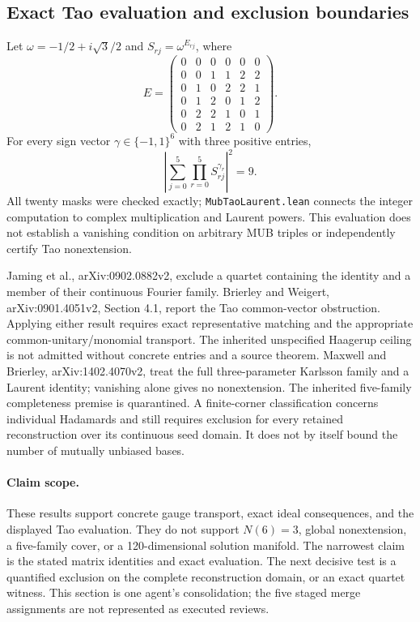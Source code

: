 \subsection{Exact Tao evaluation and exclusion boundaries}
Let $\omega=-1/2+i\sqrt3/2$ and $S_{rj}=\omega^{E_{rj}}$, where
\[
 E=\begin{pmatrix}
 0&0&0&0&0&0\\0&0&1&1&2&2\\0&1&0&2&2&1\\
 0&1&2&0&1&2\\0&2&2&1&0&1\\0&2&1&2&1&0
 \end{pmatrix}.
\]
For every sign vector $\gamma\in\{-1,1\}^6$ with three positive entries,
\[
 \left|\sum_{j=0}^{5}\prod_{r=0}^{5}S_{rj}^{\gamma_r}\right|^2=9.
\]
All twenty masks were checked exactly; \texttt{MubTaoLaurent.lean}
connects the integer computation to complex multiplication and Laurent
powers. This evaluation does not establish a vanishing condition on
arbitrary MUB triples or independently certify Tao nonextension.

Jaming et al., arXiv:0902.0882v2, exclude a quartet containing the identity
and a member of their continuous Fourier family. Brierley and Weigert,
arXiv:0901.4051v2, Section 4.1, report the Tao common-vector obstruction.
Applying either result requires exact representative matching and the
appropriate common-unitary/monomial transport. The inherited unspecified
Haagerup ceiling is not admitted without concrete entries and a source theorem.
Maxwell and Brierley, arXiv:1402.4070v2, treat the full three-parameter
Karlsson family and a Laurent identity; vanishing alone gives no nonextension.
The inherited five-family completeness premise is quarantined.
A finite-corner classification concerns individual Hadamards and still
requires exclusion for every retained reconstruction over its continuous
seed domain. It does not by itself bound the number of mutually unbiased bases.

\paragraph{Claim scope.}
These results support concrete gauge transport, exact ideal consequences,
and the displayed Tao evaluation. They do not support $N(6)=3$, global
nonextension, a five-family cover, or a 120-dimensional solution manifold.
The narrowest claim is the stated matrix identities and exact evaluation.
The next decisive test is a quantified exclusion on the complete reconstruction
domain, or an exact quartet witness. This section is one agent's consolidation;
the five staged merge assignments are not represented as executed reviews.
